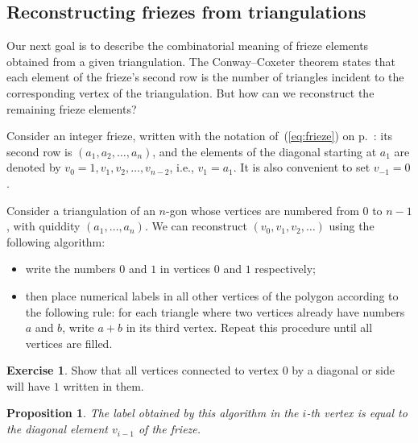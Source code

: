 \documentclass[a4paper,11pt]{amsart}
\theoremstyle{plain}
\newtheorem{prop}[theorem]{Proposition}
\theoremstyle{remark}
\theoremstyle{definition}
\newtheorem{exercise}[theorem]{Exercise}
\numberwithin{equation}{section}
\numberwithin{figure}{section}
\begin{document}
\subsection{Reconstructing friezes from triangulations}\label{ssec:friezetriang}

Our next goal is to describe the combinatorial meaning of frieze elements obtained from a given triangulation. The Conway--Coxeter theorem states that each element of the frieze's second row is the number of triangles incident to the corresponding vertex of the triangulation. But how can we reconstruct the remaining frieze elements?

Consider an integer frieze, written with the notation of~(\ref{eq:frieze}) on p.~\pageref{eq:frieze}: its second row is $(a_1,a_2,\dots,a_n)$, and the elements of the diagonal starting at $a_1$ are denoted by $v_0=1,v_1,v_2,\dots,v_{n-2}$, i.e., $v_1=a_1$. It is also convenient to set $v_{-1}=0$.

Consider a triangulation of an $n$-gon whose vertices are numbered from $0$ to $n-1$, with quiddity $(a_1,\dots,a_n)$. We can reconstruct $(v_0,v_1,v_2,\dots)$ using the following algorithm:

\begin{itemize}
    \item write the numbers $0$ and $1$ in vertices $0$ and $1$ respectively;
    \item then place numerical labels in all other vertices of the polygon according to the following  rule: for each triangle where two vertices already have numbers $a$ and $b$, write $a+b$ in its third vertex. Repeat this procedure until all vertices are filled.
\end{itemize}

\begin{exercise}
Show that all vertices connected to vertex $0$ by a diagonal or side will have $1$ written in them.
\end{exercise}

\begin{prop}\label{prop:algtriang} The label obtained by this algorithm in the $i$-th vertex is equal to the diagonal element $v_{i-1}$ of the frieze.
\end{prop}
\end{document}
